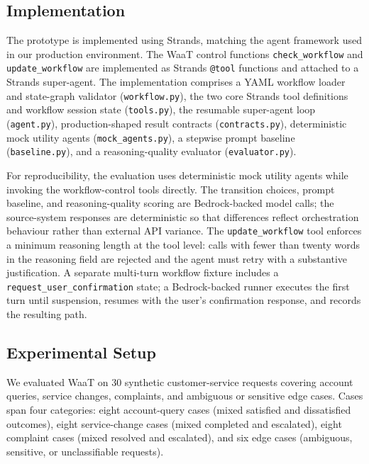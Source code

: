 \documentclass[10pt,conference]{IEEEtran}
\begin{document}
\subsection{Implementation}

The prototype is implemented using Strands, matching the agent
framework used in our production environment.  The WaaT control
functions \texttt{check\_workflow} and \texttt{update\_workflow}
are implemented as Strands \texttt{@tool} functions and attached
to a Strands super-agent.  The implementation comprises a YAML
workflow loader and state-graph validator (\texttt{workflow.py}),
the two core Strands tool definitions and workflow session state
(\texttt{tools.py}), the resumable super-agent loop
(\texttt{agent.py}), production-shaped result contracts
(\texttt{contracts.py}), deterministic mock utility agents
(\texttt{mock\_agents.py}), a stepwise prompt baseline
(\texttt{baseline.py}), and a reasoning-quality evaluator
(\texttt{evaluator.py}).

For reproducibility, the evaluation uses deterministic mock
utility agents while invoking the workflow-control tools directly.
The transition choices, prompt baseline, and reasoning-quality
scoring are Bedrock-backed model calls; the source-system responses
are deterministic so that differences reflect orchestration
behaviour rather than external API variance.  The
\texttt{update\_workflow} tool enforces a minimum reasoning length
at the tool level: calls with fewer than twenty words in the
reasoning field are rejected and the agent must retry with a
substantive justification.  A separate multi-turn workflow fixture
includes a \texttt{request\_user\_confirmation} state; a
Bedrock-backed runner executes the first turn until suspension,
resumes with the user's confirmation response, and records the
resulting path.

\subsection{Experimental Setup}
\label{subsec:waat-experimental-setup}

We evaluated WaaT on 30 synthetic customer-service requests
covering account queries, service changes, complaints, and
ambiguous or sensitive edge cases.  Cases span four categories:
eight account-query cases (mixed satisfied and dissatisfied
outcomes), eight service-change cases (mixed completed and
escalated), eight complaint cases (mixed resolved and escalated),
and six edge cases (ambiguous, sensitive, or unclassifiable
requests).
\end{document}
